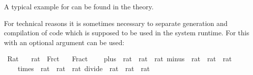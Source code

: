 \begin{isabellebody}
\begin{isamarkuptext}
  A typical example for \hyperlink{command.code-reflect}{\mbox{}} can be found in the
  \hyperlink{theory.Predicate}{\mbox{}} theory.%
\end{isamarkuptext}%
\isamarkuptrue%
%
\isamarkuptrue%
%
\begin{isamarkuptext}%
For technical reasons it is sometimes necessary to separate
  generation and compilation of code which is supposed to be used in
  the system runtime.  For this \hyperlink{command.code-reflect}{\mbox{}} with an
  optional  argument can be used:%
\end{isamarkuptext}%
\isamarkuptrue%
%
\isadelimquote
%
\endisadelimquote
%
\isatagquote
{}\isamarkupfalse%
\ Rat\isanewline
\ \ \ rat\ {}\ Frct\isanewline
\ \ \ Fract\isanewline
\ \ \ \ {}{}plus\ {}{}\ rat\ {}\ rat\ {}\ rat{}{}\ {}{}minus\ {}{}\ rat\ {}\ rat\ {}\ rat{}{}\isanewline
\ \ \ \ {}{}times\ {}{}\ rat\ {}\ rat\ {}\ rat{}{}\ {}{}divide\ {}{}\ rat\ {}\ rat\ {}\ rat{}{}\isanewline

\end{isabellebody}

